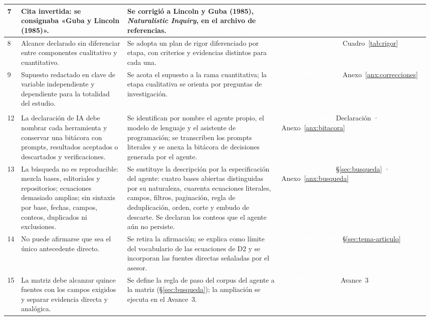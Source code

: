 \documentclass[letter,12pt]{article}
\newcommand{\bOK}{\colorbox{colorPropuesto}{\textcolor{white}{\scriptsize\textbf{~ATENDIDO~}}}}
\newcommand{\bCOR}{\colorbox{colorNuevo}{\textcolor{white}{\scriptsize\textbf{~CORREGIDO~}}}}
\newcommand{\bPEN}{\colorbox{colorOriginal}{\textcolor{white}{\scriptsize\textbf{~PENDIENTE~}}}}
\begin{document}
\begin{longtable}{|p{0.5cm}|p{4.4cm}|p{5.2cm}|p{3.4cm}|}
7 & Cita invertida: se consignaba «Guba y Lincoln (1985)». & Se corrigió a Lincoln y Guba (1985), \textit{Naturalistic Inquiry}, en el archivo de referencias. & \bCOR~\citep{lincolnguba1985} \\
\hline

8 & Alcance declarado sin diferenciar entre componentes cualitativo y cuantitativo. & Se adopta un plan de rigor diferenciado por etapa, con criterios y evidencias distintos para cada una. & \bCOR~Cuadro~\ref{tab:rigor} \\
\hline

9 & Supuesto redactado en clave de variable independiente y dependiente para la totalidad del estudio. & Se acota el supuesto a la rama cuantitativa; la etapa cualitativa se orienta por preguntas de investigación. & \bCOR~Anexo~\ref{anx:correcciones} \\
\hline
\rowcolor{bgNuevo}
\multicolumn{4}{|l|}{\textbf{\textcolor{colorNuevo}{Observaciones de la retroalimentación del Avance 1}}} \\
\hline

12 & La declaración de IA debe nombrar cada herramienta y conservar una bitácora con prompts, resultados aceptados o descartados y verificaciones. & Se identifican por nombre el agente propio, el modelo de lenguaje y el asistente de programación; se transcriben los prompts literales y se anexa la bitácora de decisiones generada por el agente. & \bOK~Declaración · Anexo~\ref{anx:bitacora} \\
\hline

13 & La búsqueda no es reproducible: mezcla bases, editoriales y repositorios; ecuaciones demasiado amplias; sin sintaxis por base, fechas, campos, conteos, duplicados ni exclusiones. & Se sustituye la descripción por la especificación del agente: cuatro bases abiertas distinguidas por su naturaleza, cuarenta ecuaciones literales, campos, filtros, paginación, regla de deduplicación, orden, corte y embudo de descarte. Se declaran los conteos que el agente aún no persiste. & \bOK~\S\ref{sec:busqueda} · Anexo~\ref{anx:busqueda} \\
\hline

14 & No puede afirmarse que \citet{seeger2026} sea el único antecedente directo. & Se retira la afirmación; se explica como límite del vocabulario de las ecuaciones de D2 y se incorporan las fuentes directas señaladas por el asesor. & \bCOR~\S\ref{sec:tema-articulo} \\
\hline

15 & La matriz debe alcanzar quince fuentes con los campos exigidos y separar evidencia directa y analógica. & Se define la regla de paso del corpus del agente a la matriz (\S\ref{sec:busqueda}); la ampliación se ejecuta en el Avance~3. & \bPEN~Avance~3 \\
\hline

\end{longtable}
\end{document}

